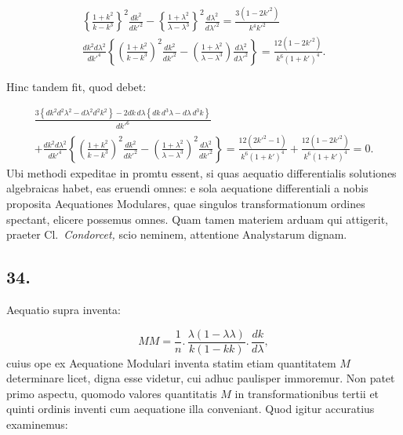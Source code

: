 \documentclass{article}
\begin{document}
\[
\begin{gathered}
\left\{\frac{1+k^{2}}{k-k^{3}}\right\}^{2}\frac{dk^{2}}{dk'^{2}}-\left\{\frac{1+\lambda^{2}}{\lambda-\lambda^{3}}\right\}^{2}\frac{d\lambda^{2}}{d\lambda'^{2}}=\frac{3(1-2k'^{2})}{k^{4}k'^{2}}\\[1.5ex]
\frac{dk^{2}d\lambda^{2}}{dk'^{4}}\left\{\left(\frac{1+k^{2}}{k-k^{3}}\right)^{2}\frac{dk^{2}}{dk'^{2}}-\left(\frac{1+\lambda^{2}}{\lambda-\lambda^{3}}\right)\frac{d\lambda^{2}}{d\lambda'^{2}}\right\}=\frac{12(1-2k'^{2})}{k^{6}(1+k')^{4}}.
\end{gathered}
\]

Hinc tandem fit, quod debet:

\[
\begin{gathered}
\frac{3\left\{dk^{2}d^{2}\lambda^{2}-d\lambda^{2}d^{2}k^{2}\right\}-2dk\,d\lambda\left\{dk\,d^{3}\lambda-d\lambda\,d^{3}k\right\}}{dk'^{6}}\\[1.5ex]
+\frac{dk^{2}d\lambda^{2}}{dk'^{4}}\left\{\left(\frac{1+k^{2}}{k-k^{3}}\right)^{2}\frac{dk^{2}}{dk'^{2}}-\left(\frac{1+\lambda^{2}}{\lambda-\lambda^{3}}\right)^{2}\frac{d\lambda^{2}}{dk'^{2}}\right\}=\frac{12(2k'^{2}-1)}{k^{6}(1+k')^{4}}+\frac{12(1-2k'^{2})}{k^{6}(1+k')^{4}}=0.
\end{gathered}
\]
Ubi methodi expeditae in promtu essent, si quas aequatio differentialis solutiones algebraicas habet, eas eruendi omnes: e sola aequatione differentiali a nobis proposita Aequationes Modulares, quae singulos transformationum ordines spectant, elicere possemus omnes. Quam tamen materiem arduam qui attigerit, praeter Cl.\ \emph{Condorcet,} scio neminem, attentione Analystarum dignam.

\subsection*{34.}

Aequatio supra inventa:

\[
MM=\frac{1}{n}.\,\frac{\lambda(1-\lambda\lambda)}{k(1-kk)}.\,\frac{dk}{d\lambda},
\]
cuius ope ex Aequatione Modulari inventa statim etiam quantitatem $M$ determinare licet, digna esse videtur, cui adhuc paulisper immoremur. Non patet primo aspectu, quomodo valores quantitatis $M$ in transformationibus tertii et quinti ordinis inventi cum aequatione illa conveniant. Quod igitur accuratius examinemus:
\end{document}
